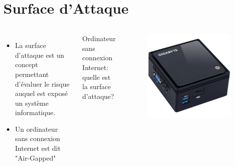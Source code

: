 \section{Surface d'Attaque}

\begin{frame}
\begin{columns}
\begin{itemize}
    \item La surface d'attaque est un concept permettant d'évaluer le risque auquel est exposé un système informatique.
    \item Un ordinateur sans connexion Internet est dit "Air-Gapped"
\end{itemize}
Ordinateur sans connexion Internet: quelle est la surface d'attaque?
\begin{figure}
\includegraphics[scale=0.15]{res/brix}
\end{figure}
 
\end{columns}


\end{frame}

